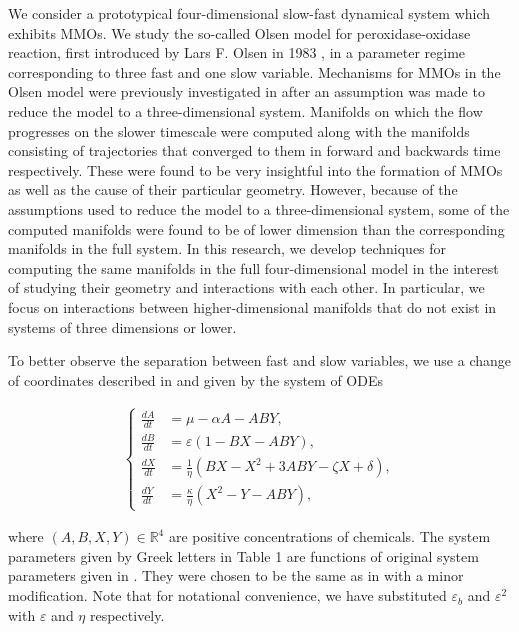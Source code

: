 \documentclass{ws-ijbc}
\begin{document}
We consider a prototypical four-dimensional slow-fast dynamical system which exhibits MMOs.  We study the so-called Olsen model for peroxidase-oxidase reaction, first introduced by Lars F. Olsen in 1983  \cite{Olsen}, in a parameter regime corresponding to three fast and one slow variable.  Mechanisms for MMOs in the Olsen model were previously investigated in \cite{QSSA} after an assumption was made to reduce the model to a three-dimensional system.  Manifolds on which the flow progresses on the slower timescale were computed along with the manifolds consisting of trajectories that converged to them in forward and backwards time respectively.  These were found to be very insightful into the formation of MMOs as well as the cause of their particular geometry.  However, because of the assumptions used to reduce the model to a three-dimensional system, some of the computed manifolds were found to be of lower dimension than the corresponding manifolds in the full system.  In this research, we develop techniques for computing the same manifolds in the full four-dimensional model in the interest of studying their geometry and interactions with each other.  In particular, we focus on interactions between higher-dimensional manifolds that do not exist in systems of three dimensions or lower.


To better observe the separation between fast and slow variables, we use a change of coordinates described in \cite{Rescaling} and given by the system of ODEs
    
    \begin{equation}
        \begin{aligned}
            \begin{cases}
                \frac{dA}{dt} &= \mu - \alpha A - ABY, \\
                \frac{dB}{dt} &= \varepsilon(1-BX - ABY), \\
                \frac{dX}{dt} &= \frac{1}{\eta}(BX - X^2 +3ABY - \zeta X + \delta), \\
                \frac{dY}{dt} &= \frac{\kappa}{\eta}(X^2 - Y - ABY),
            \end{cases}
        \end{aligned}
        \label{equation_1}
    \end{equation}
    
\noindent
where $(A, B, X, Y)\in\mathbb{R}^{4}$ are positive concentrations of chemicals.  The system parameters given by Greek letters in Table 1 are functions of original system parameters given in \cite{Olsen}. They were chosen to be the same as in \cite{Rescaling} with a minor modification.  Note that for notational convenience, we have substituted  $\varepsilon_{b}$ and $\varepsilon^{2}$ \cite{Rescaling} with $\varepsilon$ and $\eta$ respectively.
\end{document}
